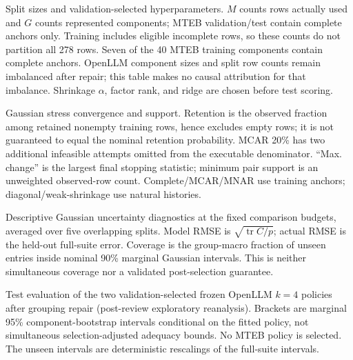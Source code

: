 \documentclass{article}
\newcommand{\tr}{\operatorname{tr}}
\begin{document}
\begin{table}[ht]
\caption{Split sizes and validation-selected hyperparameters. $M$ counts rows actually used and $G$ counts represented components; MTEB validation/test contain complete anchors only. Training includes eligible incomplete rows, so these counts do not partition all 278 rows. Seven of the 40 MTEB training components contain complete anchors. OpenLLM component sizes and split row counts remain imbalanced after repair; this table makes no causal attribution for that imbalance. Shrinkage $\alpha$, factor rank, and ridge are chosen before test scoring.}
\label{tab:splits}
\centering
\resizebox{\textwidth}{!}{}
\end{table}

\begin{table}[ht]
\caption{Gaussian stress convergence and support. Retention is the observed fraction among retained nonempty training rows, hence excludes empty rows; it is not guaranteed to equal the nominal retention probability. MCAR 20\% has two additional infeasible attempts omitted from the executable denominator. ``Max. change'' is the largest final stopping statistic; minimum pair support is an unweighted observed-row count. Complete/MCAR/MNAR use training anchors; diagonal/weak-shrinkage use natural histories.}
\label{tab:convergence}
\centering

\end{table}

\begin{table}[ht]
\caption{Descriptive Gaussian uncertainty diagnostics at the fixed comparison budgets, averaged over five overlapping splits. Model RMSE is $\sqrt{\tr C/p}$; actual RMSE is the held-out full-suite error. Coverage is the group-macro fraction of unseen entries inside nominal 90\% marginal Gaussian intervals. This is neither simultaneous coverage nor a validated post-selection guarantee.}
\label{tab:calibration}
\centering

\end{table}

\begin{table}[ht]
\caption{Test evaluation of the two validation-selected frozen OpenLLM $k=4$ policies after grouping repair (post-review exploratory reanalysis). Brackets are marginal 95\% component-bootstrap intervals conditional on the fitted policy, not simultaneous selection-adjusted adequacy bounds. No MTEB policy is selected. The unseen intervals are deterministic rescalings of the full-suite intervals.}
\label{tab:policytest}
\centering

\end{table}
\end{document}
